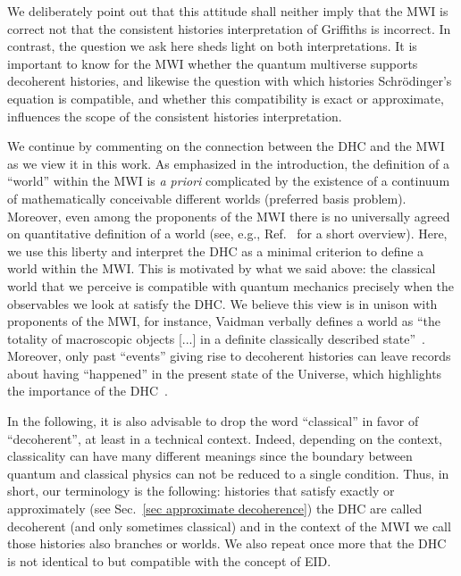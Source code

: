 \documentclass[pre,onecolumn,12pt,aps,longbibliography,nofootinbib]{revtex4-2}
\newcommand{\blue}[1]{#1}
\begin{document}
We deliberately point out that this attitude shall neither imply that the MWI is correct not that the consistent histories interpretation of Griffiths is incorrect. In contrast, the question we ask here sheds light on both interpretations. It is important to know for the MWI whether the quantum multiverse supports decoherent histories, and likewise the question with which histories Schr\"odinger's equation is compatible, and whether this compatibility is exact or approximate, influences the scope of the consistent histories interpretation.

We continue by commenting on the connection between the DHC and the MWI as we view it in this work. As emphasized in the introduction, the definition of a ``world'' within the MWI is \emph{a priori} complicated by the existence of a continuum of mathematically conceivable different worlds (preferred basis problem). Moreover, even among the proponents of the MWI there is no universally agreed on quantitative definition of a world \blue{(see, e.g., Ref.~\cite{JessRiedelBlog2023} for a short overview)}. Here, we use this liberty and interpret the DHC as a minimal criterion to define a world within the MWI. This is motivated by what we said above: the classical world that we perceive is compatible with quantum mechanics precisely when the observables we look at satisfy the DHC. We believe this view is in unison with proponents of the MWI, for instance, Vaidman verbally defines a world as ``the totality of macroscopic objects [...] in a definite classically described state''~\cite{Vaidman2021}. Moreover, \blue{only past ``events'' giving rise to decoherent histories can leave records about having ``happened'' in the present state of the Universe, which highlights the importance of the DHC}~\cite{AlbrechtPRD1992, GellMannHartlePRD1993, FinkelsteinPRD1993, PazZurekPRD1993, HalliwellPRD1999, DoddHalliwellPRD2003, RiedelZurekZwolakPRA2016, HartleArXiv2016}.

In the following, it is also advisable to drop the word ``classical'' in favor of ``decoherent'', at least in a technical context. Indeed, depending on the context, classicality can have many different meanings since the boundary between quantum and classical physics can not be reduced to a single condition. Thus, in short, our terminology is the following: histories that satisfy exactly or approximately (see Sec.~\ref{sec approximate decoherence}) the DHC are called decoherent (and only sometimes classical) and in the context of the MWI we call those histories also branches or worlds. We also repeat once more that the DHC is not identical to but compatible with the concept of EID.
\end{document}
